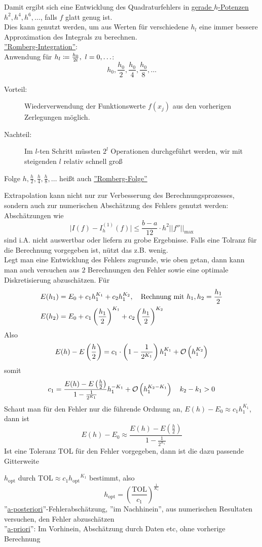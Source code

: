 \documentclass{../Skript}
\begin{document}
{Damit ergibt sich eine Entwicklung des Quadraturfehlers in \underline{gerade
 $h$-Potenzen} $h^2, h^4, h^6, \dots$, falls $f$ glatt genug ist.\\
Dies kann genutzt werden, um aus Werten für verschiedene $h_l$ 
eine immer bessere Approximation des Integrals zu berechnen.\\
\underline{''Romberg-Integration''}:\\
Anwendung für $h_l \coloneqq \frac{h_0}{2l}, \ \igb l 0 {}$:\[
    h_0,\frac{h_0}{2},\frac{h_0}{4},\frac{h_0}{8},\dots\]
\begin{description}
    \item[Vorteil:] Wiederverwendung der Funktionswerte $f(x_j)$ aus den 
    vorherigen Zerlegungen möglich.
    \item[Nachteil:] Im $l$-ten Schritt müssten $2^l$ Operationen durchgeführt 
    werden, wir mit steigenden $l$ relativ schnell groß 
\end{description} 
\begin{remark}
    Folge $h,\frac{h}{2},\frac{h}{4},\frac{h}{8},\dots$ heißt auch \underline{
        ''Romberg-Folge''
    }
\end{remark}
Extrapolation kann nicht nur zur Verbesserung des Berechnungsprozesses, sondern
auch zur numerischen Abschätzung des Fehlers genutzt werden:\\ Abschätzungen wie
\[
\vert I(f)-I_h^{(1)}(f)\vert \leq\frac{b-a}{12}\cdot h^2\vert\vert f''\vert\vert_{\max}
\]
sind i.A. nicht auswertbar oder liefern zu grobe Ergebnisse. Falls eine Tolranz
für die Berechnung vorgegeben ist, nützt das z.B. wenig. \\
Legt man eine Entwicklung des Fehlers zugrunde, wie oben getan, dann kann man
auch versuchen aus \(2\) Berechnungen den Fehler sowie eine optimale 
Diskretisierung abzuschätzen. Für \begin{align*}
    E(h_1) &= E_0 + c_1h_1^{K_1}+c_2h_1^{K_2}, \hspace{1em} \text{Rechnung mit }h_1,
    h_2 = \frac{h_1}{2}\\
    E(h_2) &= E_0 + c_1\left(\frac{h_1}{2}\right)^{K_1} + c_2\left(\frac{h_1}{2}\right)^{K_2}
\end{align*}
Also \[
    E(h) - E\left(\frac{h}{2}\right) = c_1\cdot\left(1-\frac{1}{2^{K_1}}\right) h_1^{K_1} + \calO{h_1^{K_2}}\]
somit \[
    c_1 = \frac{E(h) - E\left(\frac{h}{2}\right)}{1-\frac{1}{2^{K_1}}}h_1^{-K_1} + \calO{h_1^{K_2-K_1}}\largespace k_2-k_1 > 0\]
Schaut man für den Fehler nur die führende Ordnung an, $E(h) - E_0 \approx c_1h_1^{K_1}$, 
dann ist \[
    E(h) - E_0 \approx \frac{E(h) - E\left(\frac{h}{2}\right)}{1-\frac{1}{2^{K_1}}}\] 
Ist eine Toleranz TOL für den Fehler vorgegeben, dann ist die dazu passende Gitterweite
\def\hopt{\ensuremath{h_{\text{opt}}}}

$\hopt$ durch TOL$\approx c_1 \hopt^{K_1}$ bestimmt, also \[
    \hopt = \left(\frac{\text{TOL}}{c_1}\right)^{\frac{1}{K_1}}\]
''\underline{a-posteriori}''-Fehlerabschätzung, ''im Nachhinein'', aus numerischen Resultaten 
versuchen, den Fehler abzuschätzen\\
''\underline{a-priori}'': Im Vorhinein, Abschätzung durch Daten etc, ohne vorherige Berechnung


}
\end{document}
